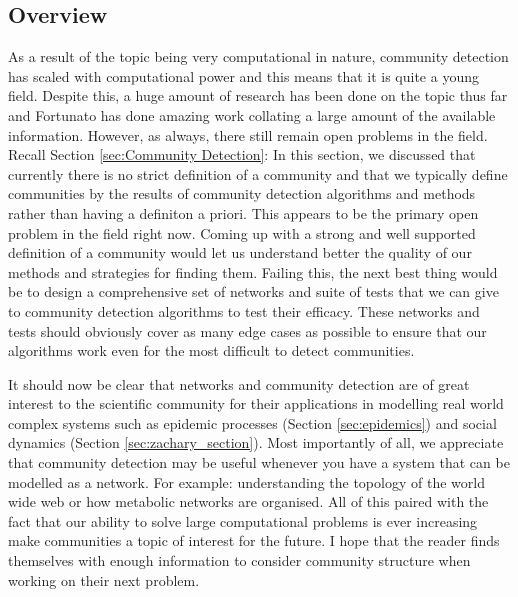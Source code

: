 \subsection{Overview}
As a result of the topic being very computational in nature, community detection has scaled with computational power and this means that it is quite a young field. Despite this, a huge amount of research has been done on the topic thus far and Fortunato has done amazing work collating a large amount of the available information.\cite{fortunato} However, as always, there still remain open problems in the field. Recall Section \ref{sec:Community Detection}: In this section, we discussed that currently there is no strict definition of a community and that we typically define communities by the results of community detection algorithms and methods rather than having a definiton a priori. This appears to be the primary open problem in the field right now. Coming up with a strong and well supported definition of a community would let us understand better the quality of our methods and strategies for finding them. Failing this, the next best thing would be to design a comprehensive set of networks and suite of tests that we can give to community detection algorithms to test their efficacy. These networks and tests should obviously cover as many edge cases as possible to ensure that our algorithms work even for the most difficult to detect communities.

It should now be clear that networks and community detection are of great interest to the scientific community for their applications in modelling real world complex systems such as epidemic processes (Section \ref{sec:epidemics}) and social dynamics (Section \ref{sec:zachary_section}). Most importantly of all, we appreciate that community detection may be useful whenever you have a system that can be modelled as a network. For example: understanding the topology of the world wide web\cite{BARABASI200069} or how metabolic networks are organised\cite{Jeong2000}. All of this paired with the fact that our ability to solve large computational problems is ever increasing make communities a topic of interest for the future. I hope that the reader finds themselves with enough information to consider community structure when working on their next problem.
